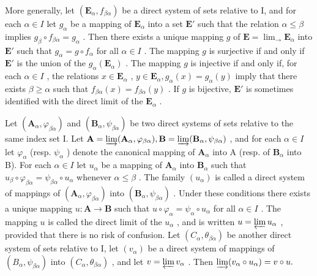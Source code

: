 More generally, let \((\mathbf{E}_{\alpha}, f_{\beta \alpha})\) be a direct system of sets relative to I, and for each \(\alpha \in I\) let \(g_{\alpha}\) be a mapping of \(\mathbf{E}_{\alpha}\) into a set \(\mathbf{E}'\) such that the relation \(\alpha \leqslant \beta\) implies \(g_{\beta} \circ f_{\beta \alpha} = g_{\alpha}\) . Then there exists a unique mapping \(g\) of \(\mathbf{E} = \lim_{\rightarrow} \mathbf{E}_{\alpha}\) into \(\mathbf{E}'\) such that \(g_{\alpha} = g \circ f_{\alpha}\) for all \(\alpha \in I\) . The mapping \(g\) is surjective if and only if \(\mathbf{E}'\) is the union of the \(g_{\alpha}(\mathbf{E}_{\alpha})\) . The mapping \(g\) is injective if and only if, for each \(\alpha \in I\) , the relations \(x \in \mathbf{E}_{\alpha}\) , \(y \in \mathbf{E}_{\alpha}, g_{\alpha}(x) = g_{\alpha}(y)\) imply that there exists \(\beta \geqslant \alpha\) such that \(f_{\beta \alpha}(x) = f_{\beta \alpha}(y)\) . If \(g\) is bijective, \(\mathbf{E}'\) is sometimes identified with the direct limit of the \(\mathbf{E}_{\alpha}\) .

Let \((\mathbf{A}_{\alpha}, \varphi_{\beta \alpha})\) and \((\mathbf{B}_{\alpha}, \psi_{\beta \alpha})\) be two direct systems of sets relative to the same index set I. Let \(\mathbf{A} = \varinjlim (\mathbf{A}_{\alpha}, \varphi_{\beta \alpha}), \mathbf{B} = \varinjlim (\mathbf{B}_{\alpha}, \psi_{\beta \alpha})\) , and for each \(\alpha \in I\) let \(\varphi_{\alpha}\) (resp. \(\psi_{\alpha}\) ) denote the canonical mapping of \(\mathbf{A}_{\alpha}\) into A (resp. of \(\mathbf{B}_{\alpha}\) into B). For each \(\alpha \in I\) let \(u_{\alpha}\) be a mapping of \(\mathbf{A}_{\alpha}\) into \(\mathbf{B}_{\alpha}\) such that \(u_{\beta} \circ \varphi_{\beta \alpha} = \psi_{\beta \alpha} \circ u_{\alpha}\) whenever \(\alpha \leqslant \beta\) . The family \((u_{\alpha})\) is called a direct system of mappings of \((\mathbf{A}_{\alpha}, \varphi_{\beta \alpha})\) into \((\mathbf{B}_{\alpha}, \psi_{\beta \alpha})\) . Under these conditions there exists a unique mapping \(u: \mathbf{A} \to \mathbf{B}\) such that \(u \circ \varphi_{\alpha} = \psi_{\alpha} \circ u_{\alpha}\) for all \(\alpha \in I\) . The mapping \(u\) is called the direct limit of the \(u_{\alpha}\) , and is written \(u = \varprojlim u_{\alpha}\) , provided that there is no risk of confusion. Let \((C_{\alpha}, \theta_{\beta \alpha})\) be another direct system of sets relative to I, let \((v_{\alpha})\) be a direct system of mappings of \((B_{\alpha}, \psi_{\beta \alpha})\) into \((C_{\alpha}, \theta_{\beta \alpha})\) , and let \(v = \varprojlim v_{\alpha}\) . Then \(\varinjlim (v_{\alpha} \circ u_{\alpha}) = v \circ u.\)

